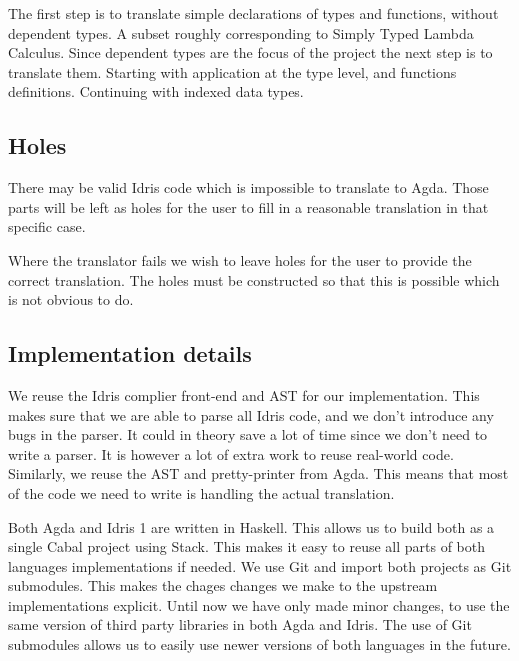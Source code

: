 \documentclass[parskip=half]{scrartcl}
\begin{document}
The first step is to translate simple declarations of types and functions,
without dependent types. A subset roughly corresponding to Simply Typed Lambda
Calculus. Since dependent types are the focus of the project the next step is
to translate them. Starting with application at the type level, and functions
definitions. Continuing with indexed data types.


\subsection{Holes}
There may be valid Idris code which is impossible to translate to Agda.  Those
parts will be left as holes for the user to fill in a reasonable translation in
that specific case.

Where the translator fails we wish to leave holes for the user to provide the
correct translation.
The holes must be constructed so that this is possible
which is not obvious to do.


\subsection{Implementation details}

We reuse the Idris complier front-end and AST for our implementation. This
makes sure that we are able to parse all Idris code, and we don't introduce any
bugs in the parser. It could in theory save a lot of time since we don't need
to write a parser. It is however a lot of extra work to reuse real-world code.
Similarly, we reuse the AST and pretty-printer from Agda. This means that most
of the code we need to write is handling the actual translation.

Both Agda and Idris 1 are written in Haskell.  This allows us to build both as
a single Cabal project using Stack.  This makes it easy to reuse all parts of
both languages implementations if needed.  We use Git and import both projects
as Git submodules. This makes the chages changes we make to the upstream
implementations explicit.  Until now we have only made minor changes, to use
the same version of third party libraries in both Agda and Idris. The use of
Git submodules allows us to easily use newer versions of both languages in the
future.

\end{document}
